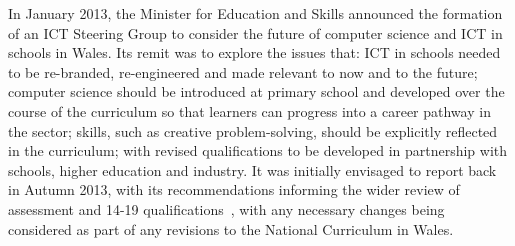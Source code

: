 \documentclass{llncs}
\begin{document}




In January 2013, the Minister for Education and Skills
announced the formation of an ICT Steering Group to consider
the future of computer science and ICT in schools in Wales.
Its remit was to explore the issues that: ICT in schools needed to be
re-branded, re-engineered and made relevant to now and to the future;
computer science should be introduced at primary school and developed
over the course of the curriculum so that learners can progress into a
career pathway in the sector; skills, such as creative
problem-solving, should be explicitly reflected in the curriculum;
with revised qualifications to be developed in partnership with
schools, higher education and industry.  It was initially envisaged to
report back in Autumn 2013, with its recommendations informing the
wider review of assessment and 14-19
qualifications~\cite{wgrev14-19:2014}, with any necessary changes
being considered as part of any revisions to the National Curriculum
in Wales.
\end{document}
